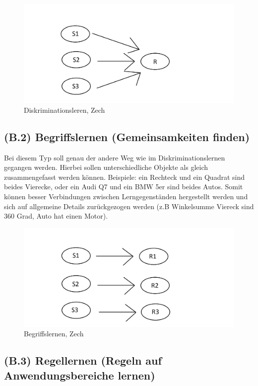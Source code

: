 \begin{figure}[!ht]
\noindent\hspace{0.5mm}\includegraphics[width=12cm]{./Ressourcen/Diskrimination.png}
\caption{Diskriminationsleren, Zech}
\end{figure}

\subsection[]{(B.2) Begriffslernen (Gemeinsamkeiten finden)}

Bei diesem Typ soll genau der andere Weg wie im Diskriminationslernen gegangen werden. Hierbei sollen unterschiedliche Objekte als gleich zusammengefasst werden können. 
Beispiele: ein Rechteck und ein Quadrat sind beides Vierecke, oder ein Audi Q7 und ein BMW 5er sind beides Autos. Somit können besser Verbindungen zwischen Lerngegenständen hergestellt werden und sich auf allgemeine Details zurückgezogen werden (z.B Winkelsumme Viereck sind 360 Grad, Auto hat einen Motor).

\begin{figure}[!ht]
\noindent\hspace{0.5mm}\includegraphics[width=12cm]{./Ressourcen/Begriffslernen.png}
\caption{Begriffslernen, Zech}
\end{figure}

\subsection[]{(B.3) Regellernen (Regeln auf Anwendungsbereiche lernen)}

